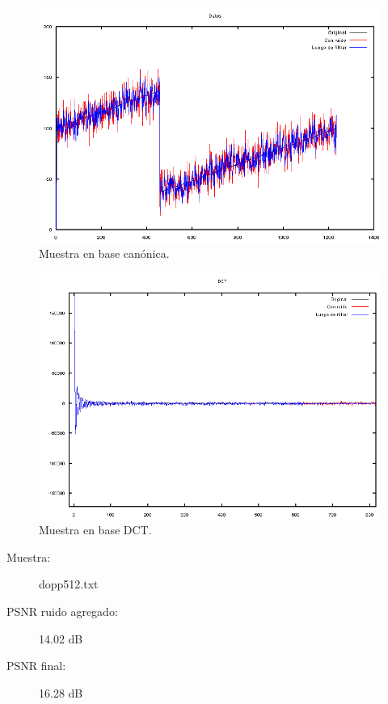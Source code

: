 \documentclass[a4paper,10pt,twoside]{article}
\begin{document}
\begin{figure}[H]
  \centering
  \includegraphics[width=15cm]{graficos/ramp_aditivo_atenuar_muestra.png}
  \caption{Muestra en base canónica.}
\end{figure}

\begin{figure}[H]
  \centering
  \includegraphics[width=15cm]{graficos/ramp_aditivo_atenuar_dct.png} 
  \caption{Muestra en base DCT.}
\end{figure}


\begin{description}
  \item[Muestra:] dopp512.txt
  \item[PSNR ruido agregado:] 14.02 dB
  \item[PSNR final:] 16.28 dB
\end{description}
\end{document}
